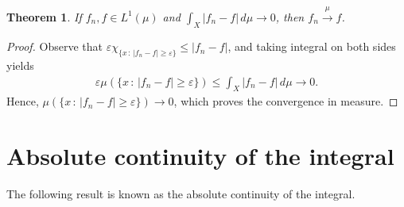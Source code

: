 \documentclass[11pt]{book}
\newtheorem{theorem}{Theorem}[chapter]
\theoremstyle{definition}
\numberwithin{equation}{chapter}
\begin{document}
\medskip

\begin{theorem}\label{theorem_226}
If $f_n, f \in L^1(\mu)$ and $\int_X \left|f_n - f\right|\,d\mu \to 0$, then $f_n \xrightarrow[]{\mu} f$.
\end{theorem}
\begin{proof}
Observe that $\varepsilon \chi_{\{x \,:\, \left|f_n - f\right| \geq \varepsilon\}} \leq \left|f_n - f\right|$, and taking integral on both sides yields
\begin{align*}
    \varepsilon \mu(\{x \,:\, \left|f_n - f\right| \geq \varepsilon\}) \leq \int_X \left|f_n - f\right| \, d\mu \to 0.
\end{align*}
Hence, $\mu(\{x \,:\, \left|f_n - f\right| \geq \varepsilon\}) \to 0$, which proves the convergence in measure.
\end{proof}

\medskip

\section{Absolute continuity of the integral}

The following result is known as the absolute continuity of the integral.

\medskip
\end{document}
